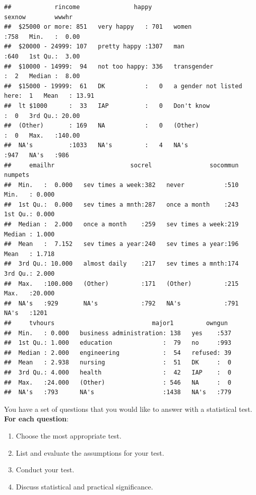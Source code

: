 \documentclass[
]{book}
\providecommand{\tightlist}{%
  \setlength{\itemsep}{0pt}\setlength{\parskip}{0pt}}
\theoremstyle{definition}
\theoremstyle{definition}
\theoremstyle{definition}
\theoremstyle{definition}
\theoremstyle{remark}
\begin{document}
\begin{verbatim}
##            rincome               happy                           sexnow        wwwhr       
##  $25000 or more: 851   very happy   : 701   women                   :758   Min.   :  0.00  
##  $20000 - 24999: 107   pretty happy :1307   man                     :640   1st Qu.:  3.00  
##  $10000 - 14999:  94   not too happy: 336   transgender             :  2   Median :  8.00  
##  $15000 - 19999:  61   DK           :   0   a gender not listed here:  1   Mean   : 13.91  
##  lt $1000      :  33   IAP          :   0   Don't know              :  0   3rd Qu.: 20.00  
##  (Other)       : 169   NA           :   0   (Other)                 :  0   Max.   :140.00  
##  NA's          :1033   NA's         :   4   NA's                    :947   NA's   :986     
##     emailhr                     socrel                socommun      numpets      
##  Min.   :  0.000   sev times a week:382   never           :510   Min.   : 0.000  
##  1st Qu.:  0.000   sev times a mnth:287   once a month    :243   1st Qu.: 0.000  
##  Median :  2.000   once a month    :259   sev times a week:219   Median : 1.000  
##  Mean   :  7.152   sev times a year:240   sev times a year:196   Mean   : 1.718  
##  3rd Qu.: 10.000   almost daily    :217   sev times a mnth:174   3rd Qu.: 2.000  
##  Max.   :100.000   (Other)         :171   (Other)         :215   Max.   :20.000  
##  NA's   :929       NA's            :792   NA's            :791   NA's   :1201    
##     tvhours                           major1         owngun   
##  Min.   : 0.000   business administration: 138   yes    :537  
##  1st Qu.: 1.000   education              :  79   no     :993  
##  Median : 2.000   engineering            :  54   refused: 39  
##  Mean   : 2.938   nursing                :  51   DK     :  0  
##  3rd Qu.: 4.000   health                 :  42   IAP    :  0  
##  Max.   :24.000   (Other)                : 546   NA     :  0  
##  NA's   :793      NA's                   :1438   NA's   :779
\end{verbatim}

You have a set of questions that you would like to answer with a statistical test. \textbf{For each question}:

\begin{enumerate}
\def\labelenumi{\arabic{enumi}.}
\tightlist
\item
  Choose the most appropriate test.
\item
  List and evaluate the assumptions for your test.
\item
  Conduct your test.
\item
  Discuss statistical and practical significance.
\end{enumerate}
\end{document}
